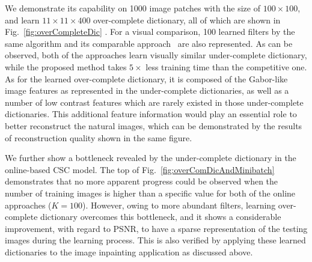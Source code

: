 We demonstrate its capability on 1000 image patches with the size of $100 \times 100$, and learn $11 \times 11 \times 400$ over-complete dictionary, all of which are shown in Fig.\ \ref{fig:overCompleteDic} . For a visual comparison, 100 learned filters by the same algorithm and its comparable approach~\cite{liu-2018-first} are also represented. As can be observed, both of the approaches learn visually similar under-complete dictionary, while the proposed method takes $5 \times$ less training time than the competitive one. As for the learned over-complete dictionary, it is composed of the Gabor-like image features as represented in the under-complete dictionaries, as well as a number of low contrast features which are rarely existed in those under-complete dictionaries. This additional feature information would play an essential role to better reconstruct the natural images, which can be demonstrated by the results of reconstruction quality shown in the same figure.

We further show a bottleneck revealed by the under-complete dictionary in the online-based CSC model. The top of Fig.\ \ref{fig:overComDicAndMinibatch} demonstrates that no more apparent progress could be observed when the number of training images is higher than a specific value for both of the online approaches ($K=100$). However, owing to more abundant filters, learning over-complete dictionary overcomes this bottleneck, and it shows a considerable improvement, with regard to PSNR, to have a sparse representation of the testing images during the learning process. This is also verified by applying these learned dictionaries to the image inpainting application as discussed above.

